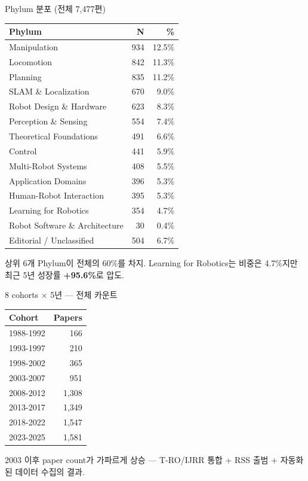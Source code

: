 \documentclass[aspectratio=169,t]{beamer}
\newcommand{\hot}[1]{\textcolor{accentorange}{\textbf{#1}}}
\newcommand{\muted}[1]{\textcolor{mutedgray}{#1}}
\begin{document}
\begin{frame}{Phylum 분포 (전체 7{,}477편)}
\centering\small
\begin{tabular}{@{}lrr@{}}
\toprule
\textbf{Phylum} & \textbf{N} & \textbf{\%} \\
\midrule
Manipulation                     & 934 & 12.5\% \\
Locomotion                       & 842 & 11.3\% \\
Planning                         & 835 & 11.2\% \\
SLAM \& Localization             & 670 &  9.0\% \\
Robot Design \& Hardware         & 623 &  8.3\% \\
Perception \& Sensing            & 554 &  7.4\% \\
Theoretical Foundations          & 491 &  6.6\% \\
Control                          & 441 &  5.9\% \\
Multi-Robot Systems              & 408 &  5.5\% \\
Application Domains              & 396 &  5.3\% \\
Human-Robot Interaction          & 395 &  5.3\% \\
Learning for Robotics            & 354 &  4.7\% \\
Robot Software \& Architecture   &  30 &  0.4\% \\
\midrule
Editorial / Unclassified         & 504 &  6.7\% \\
\bottomrule
\end{tabular}
\vfill
\muted{상위 6개 Phylum이 전체의 60\%를 차지. Learning for Robotics는 비중은 4.7\%지만 최근 5년 성장률 \hot{+95.6\%}로 압도.}
\end{frame}


\begin{frame}{8 cohorts × 5년 — 전체 카운트}
\centering
\begin{tabular}{@{}lr@{}}
\toprule
\textbf{Cohort} & \textbf{Papers} \\
\midrule
  1988-1992 & 166 \\
  1993-1997 & 210 \\
  1998-2002 & 365 \\
  2003-2007 & 951 \\
  2008-2012 & 1,308 \\
  2013-2017 & 1,349 \\
  2018-2022 & 1,547 \\
  2023-2025 & 1,581 \\
\bottomrule
\end{tabular}
\vfill
\muted{2003 이후 paper count가 가파르게 상승 — T-RO/IJRR 통합 + RSS 출범 + 자동화된 데이터 수집의 결과.}
\end{frame}
\end{document}
